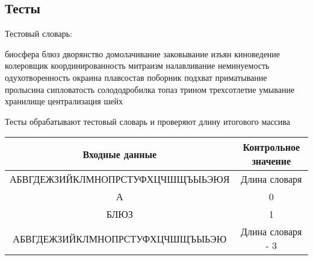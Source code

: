 \documentclass[a4paper,14pt]{article}
\begin{document}
	\subsection{Тесты}
	Тестовый словарь:
	
	биосфера блюз дворянство домолачивание заковывание изъян киноведение колеровщик координированность митраизм налавливание неминуемость одухотворенность окраина плавсостав поборник подхват приматывание пролысина сипловатость солододробилка топаз трином трехсотлетие умывание хранилище централизация шейх 

	Тесты обрабатывают тестовый словарь и проверяют длину итогового массива
	
	\begin{tabular}{|c|c|}
		\hline
		         Входные данные          & Контрольное значение \\ \hline
		АБВГДЕЖЗИЙКЛМНОПРСТУФХЦЧШЩЪЫЬЭЮЯ &    Длина словаря     \\ \hline
		               А                 &          0           \\ \hline
		              БЛЮЗ               &          1           \\ \hline
		АБВГДЕЖЗИЙКЛМНОПРСТУФХЦЧШЩЪЫЬЭЮ  &  Длина словаря - 3   \\ \hline
	\end{tabular}
	
\end{document}
